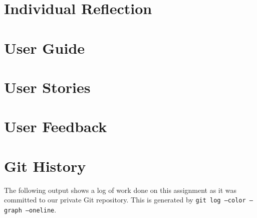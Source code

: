 \section{Individual Reflection}


\newpage

 


\appendix
\appendixpage
\addappheadtotoc

\section{User Guide}\label{sec:guide}

\section{User Stories}

\section{User Feedback}


\section{Git History}
The following output shows a log of work done on this assignment as it was committed to our private Git repository. This is generated by \texttt{git log --color --graph --oneline}.

